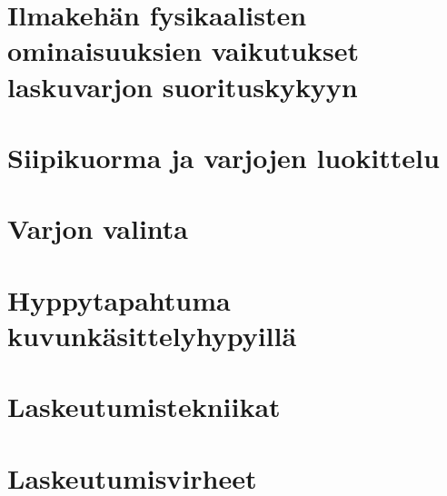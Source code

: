 \documentclass[10pt,twoside,openany,hidelinks]{memoir}
\begin{document}
\chapter{Ilmakehän fysikaalisten ominaisuuksien vaikutukset laskuvarjon suorituskykyyn}
\label{ilmakehan-fysikaalisten-ominaisuuksien-vaikutukset-laskuvarjon-suorituskykyyn}
\thispagestyle{headings}
\begin{multicols}{2}
\end{multicols}

\chapter{Siipikuorma ja varjojen luokittelu}
\label{siipikuorma-ja-varjojen-luokittelu}
\thispagestyle{headings}
\begin{multicols}{2}
\end{multicols}

\chapter{Varjon valinta}
\label{varjon-valinta}
\thispagestyle{headings}
\begin{multicols}{2}
\end{multicols}

\chapter{Hyppytapahtuma kuvunkäsittelyhypyillä}
\label{hyppytapahtuma-kuvunkasittelyhypyilla}
\thispagestyle{headings}
\begin{multicols}{2}
\end{multicols}

\chapter{Laskeutumistekniikat}
\label{laskeutumistekniikat}
\thispagestyle{headings}
\begin{multicols}{2}
\end{multicols}

\chapter{Laskeutumisvirheet}
\label{laskeutumisvirheet}
\thispagestyle{headings}
\begin{multicols}{2}
\end{multicols}
\end{document}
